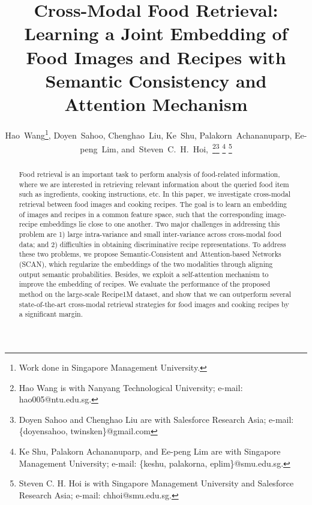 \documentclass[journal]{IEEEtran}
\begin{document}
\title{Cross-Modal Food Retrieval: Learning a Joint Embedding of Food Images and Recipes with Semantic Consistency and Attention Mechanism}


\author{Hao~Wang\thanks{Work done in Singapore Management University.},
        Doyen~Sahoo,
        Chenghao~Liu,
        Ke~Shu,
        Palakorn~Achananuparp,
        Ee-peng~Lim,
        and~Steven~C.~H.~Hoi,~\thanks{Hao Wang is with Nanyang Technological University; e-mail: hao005@ntu.edu.sg.}\thanks{Doyen Sahoo and Chenghao Liu are with Salesforce Research Asia; e-mail: \{doyensahoo, twinsken\}@gmail.com} \thanks{Ke Shu, Palakorn Achananuparp, and Ee-peng Lim are with Singapore Management University; e-mail: \{keshu, palakorna, eplim\}@smu.edu.sg.}
\thanks{Steven C. H. Hoi is with Singapore Management University and Salesforce Research Asia; e-mail: chhoi@smu.edu.sg.}}



















\maketitle

\begin{abstract}
   Food retrieval is an important task to perform analysis of food-related information, where we are interested in retrieving relevant information about the queried food item such as ingredients, cooking instructions, etc. 
   In this paper, we investigate cross-modal retrieval between food images and cooking recipes. The goal is to learn an embedding of images and recipes in a common feature space, such that the corresponding image-recipe embeddings lie close to one another.
   Two major challenges in addressing this problem are 1) large intra-variance and small inter-variance across cross-modal food data; and 2) difficulties in obtaining discriminative recipe representations. To address these two problems, we propose Semantic-Consistent and Attention-based Networks (SCAN), which regularize the embeddings of the two modalities through aligning output semantic probabilities. Besides, we exploit a self-attention mechanism to improve the embedding of recipes. We evaluate the performance of the proposed method on the large-scale Recipe1M dataset, and show that we can outperform several state-of-the-art cross-modal retrieval strategies for food images and cooking recipes by a significant margin.
\end{abstract}
\end{document}
